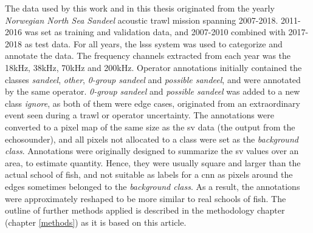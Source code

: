     The data used by this work and in this thesis originated from the yearly \textit{Norwegian North Sea Sandeel} acoustic trawl mission spanning 2007-2018\cite{brautaset2020acoustic}. 2011-2016 was set as training and validation data, and 2007-2010 combined with 2017-2018 as test data. For all years, the \gls{lsss} system was used to categorize and annotate the data. The frequency channels extracted from each year was the 18kHz, 38kHz, 70kHz and 200kHz. Operator annotations initially contained the classes \textit{sandeel}, \textit{other}, \textit{0-group sandeel} and \textit{possible sandeel}, and were annotated by the same operator. \textit{0-group sandeel} and \textit{possible sandeel} was added to a new class \textit{ignore}, as both of them were edge cases, originated from an extraordinary event seen during a trawl or operator uncertainty. The annotations were converted to a pixel map of the same size as the \gls{sv} data (the output from the echosounder), and all pixels not allocated to a class were set as the \textit{background class}. Annotations were originally designed to summarize the \gls{sv} values over an area, to estimate quantity. Hence, they were usually square and larger than the actual school of fish, and not suitable as labels for a \gls{cnn} as pixels around the edges sometimes belonged to the \textit{background class}. As a result, the annotations were approximately reshaped to be more similar to real schools of fish. The outline of further methods applied is described in the methodology chapter (chapter \ref{methods}) as it is based on this article.
    
